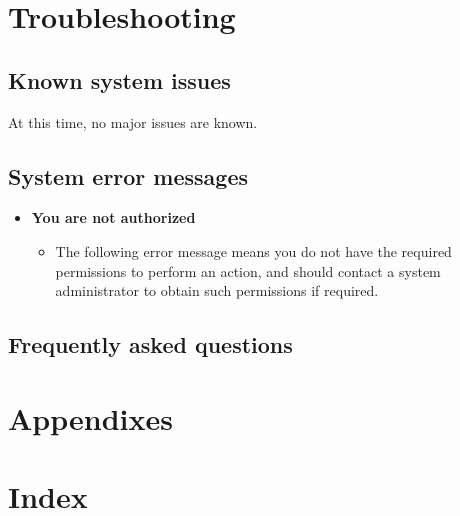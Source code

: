 \documentclass[a4paper,12pt]{article}
\begin{document}
    \pagebreak
     
    \section{Troubleshooting}
    
	    \subsection{Known system issues}
	    
	    At this time, no major issues are known.
	    
	    \subsection{System error messages}
	    
	    \begin{itemize}
	    	\item \textbf{You are not authorized}
	    	\begin{itemize}
	    		\item The following error message means you do not have the required permissions to perform an action, and should contact a system administrator to obtain such permissions if required.
	    	\end{itemize}
	    \end{itemize}
	    
	    \subsection{Frequently asked questions}
	 
	\pagebreak
	 
    \section{Appendixes}
    
    \section{Index}
    
    \pagebreak  
\end{document}
